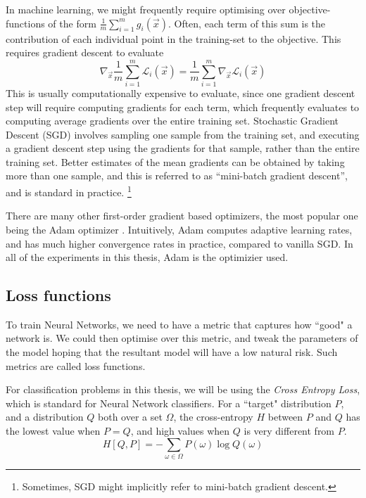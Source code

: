 \documentclass{ociamthesis}
\begin{document}
In machine learning, we might frequently require optimising over
objective-functions of the form $\frac{1}{m}\sum_{i=1}^m g_i(\vec{x})$. Often,
each term of this sum is the contribution of each individual point in the
training-set to the objective. This requires gradient descent to evaluate
\begin{equation*}
    \nabla_\vec{x} \frac{1}{m}\sum_{i=1}^m \mathcal{L}_i(\vec{x})
    = \frac{1}{m} \sum_{i=1}^m \nabla_\vec{x} \mathcal{L}_i(\vec{x})
\end{equation*}
This is usually computationally expensive to evaluate, since one gradient
descent step will require computing gradients for each term, which frequently
evaluates to computing average gradients over the entire training set.
Stochastic Gradient Descent (SGD) involves sampling one sample from the training
set, and executing a gradient descent step using the gradients for that sample,
rather than the entire training set. Better estimates of the mean gradients can
be obtained by taking more than one sample, and this is referred to as
``mini-batch gradient descent'', and is standard in practice.
\footnote{Sometimes, SGD might implicitly refer to mini-batch gradient descent.}

There are many other first-order gradient based optimizers, the most popular one
being the Adam optimizer \citep{Adam}. Intuitively, Adam computes adaptive
learning rates, and has much higher convergence rates in practice, compared to
vanilla SGD. In all of the experiments in this thesis, Adam is the optimizier
used. %

\subsection{Loss functions}
To train Neural Networks, we need to have a metric that captures how ``good" a
network is. We could then optimise over this metric, and tweak the parameters of
the model hoping that the resultant model will have a low natural risk. Such
metrics are called loss functions.

For classification problems in this thesis, we will be using the \emph{Cross
Entropy Loss}, which is standard for Neural Network classifiers. For a ``target"
distribution $P$, and a distribution $Q$ both over a set $\Omega$, the
cross-entropy $H$ between $P$ and $Q$ has the lowest value when $P=Q$, and high
values when $Q$ is very different from $P$.
\begin{equation*}
    H[Q, P] = -\sum_{\omega \in \Omega} P(\omega) \log Q(\omega)
\end{equation*}
\end{document}
